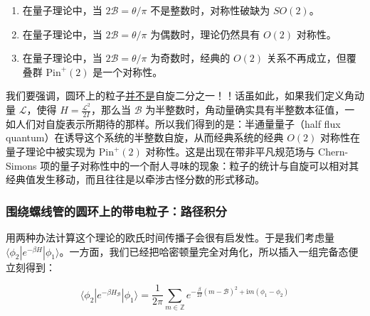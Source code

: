 
\begin{enumerate}[start=2]
  \item 在量子理论中，当 $2\mathcal{B}=\theta/\pi$ 不是整数时，对称性破缺为 $SO(2)$。

  \item 在量子理论中，当 $2\mathcal{B}=\theta/\pi$ 为偶数时，理论仍然具有 $O(2)$ 对称性。

  \item 在量子理论中，当 $2\mathcal{B}=\theta/\pi$ 为奇数时，经典的 $O(2)$ 关系不再成立，但覆叠群 $\mathrm{Pin}^{+}(2)$ 是一个对称性。
\end{enumerate}

我们要强调，圆环上的粒子\underline{并不是}自旋二分之一！！话虽如此，如果我们定义角动量 $\mathcal{L}$，使得 $H=\frac{\mathcal{L}^{2}}{2I}$，那么当 $\mathcal{B}$ 为半整数时，角动量确实具有半整数本征值，一如人们对自旋表示所期待的那样。所以我们得到的是：半通量量子（half flux quantum）在诱导这个系统的半整数自旋，从而经典系统的经典 $O(2)$ 对称性在量子理论中被实现为 $\mathrm{Pin}^{+}(2)$ 对称性。这是出现在带非平凡规范场与 Chern-Simons 项的量子对称性中的一个耐人寻味的现象：粒子的统计与自旋可以相对其经典值发生移动，而且往往是以牵涉古怪分数的形式移动。

\subsubsection{围绕螺线管的圆环上的带电粒子：路径积分} %

用两种办法计算这个理论的欧氏时间传播子会很有启发性。于是我们考虑量 $\langle\phi_2|e^{-\beta H}|\phi_1\rangle$。一方面，我们已经把哈密顿量完全对角化，所以插入一组完备态便立刻得到：

\begin{equation}
  \langle\phi_2|e^{-\beta H_{\mathcal{B}}}|\phi_1\rangle=\frac{1}{2\pi}\sum_{m\in\mathbb{Z}}e^{-\frac{\beta}{2I}(m-\mathcal{B})^{2}+\mathrm{i}m(\phi_1-\phi_2)}
  \tag{2.19}
  \label{eq:2.19}
\end{equation}

